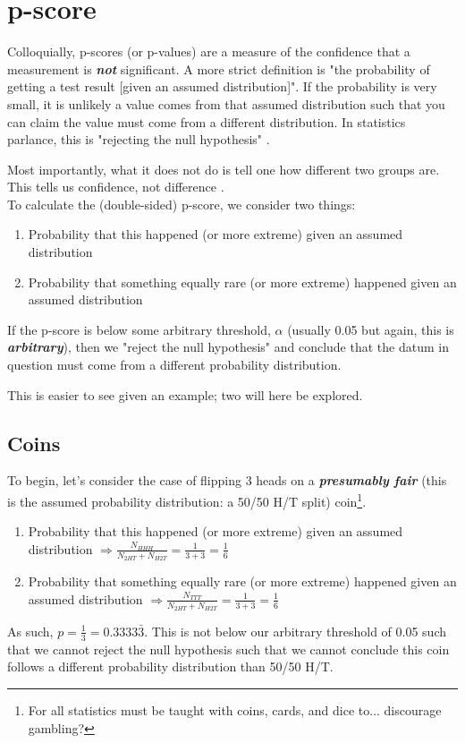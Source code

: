 \documentclass[]{article}
\begin{document}
\newpage
\appendix
\section{p-score}
\label{section_p-score}
Colloquially, p-scores (or p-values) are a measure of the confidence that a measurement is \textbf{\textit{not}} significant. 
A more strict definition is "the probability of getting a test result [given an assumed distribution]". 
If the probability is very small, it is unlikely a value comes from that assumed distribution such that you can claim the value must come from a different distribution.
In statistics parlance, this is "rejecting the null hypothesis" \cite{introstats, statquest_1, statquest_2}.

Most importantly, what it does not do is tell one how different two groups are. This tells us confidence, not difference \cite{statquest_1, statquest_2}.\\

To calculate the (double-sided) p-score, we consider two things:
\begin{enumerate}
	\item Probability that this happened (or more extreme) given an assumed distribution
	\item Probability that something equally rare (or more extreme) happened given an assumed distribution
\end{enumerate}
If the p-score is below some arbitrary threshold, $\alpha$ (usually 0.05 but again, this is \textbf{\textit{arbitrary}}), then we "reject the null hypothesis" and conclude that the datum in question must come from a different probability distribution.

This is easier to see given an example; two will here be explored.

\subsection{Coins}
To begin, let's consider the case of flipping 3 heads on a \textbf{\textit{presumably fair}} (this is the assumed probability distribution: a 50/50 H/T split) coin\footnote{For all statistics must be taught with coins, cards, and dice to... discourage gambling?}.
\begin{enumerate}
	\item Probability that this happened (or more extreme) given an assumed distribution $\Rightarrow \frac{N_{HHH}}{N_{2HT} + N_{H2T}} = \frac{1}{3 + 3} = \frac{1}{6}$ 
	\item Probability that something equally rare (or more extreme) happened given an assumed distribution $\Rightarrow \frac{N_{TTT}}{N_{2HT} + N_{H2T}} = \frac{1}{3 + 3} = \frac{1}{6}$ 
\end{enumerate}
As such, $p = \frac{1}{3} = 0.3333\bar{3}$. This is not below our arbitrary threshold of 0.05 such that we cannot reject the null hypothesis such that we cannot conclude this coin follows a different probability distribution than 50/50 H/T.\\
\end{document}
